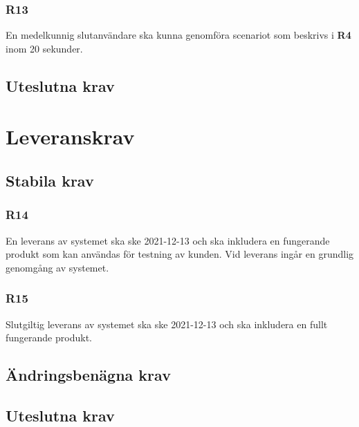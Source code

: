 \documentclass{article}
\begin{document}
    \subsubsection*{R13}
    En medelkunnig slutanvändare ska kunna genomföra scenariot som beskrivs i \textbf{R4} inom 20 sekunder.
    
    \subsection*{Uteslutna krav}
    
    \section{Leveranskrav}
    
    \subsection*{Stabila krav}
     \subsubsection*{R14}
     En leverans av systemet ska ske 2021-12-13 och ska inkludera en fungerande produkt som kan användas för testning av kunden. Vid leverans ingår en grundlig genomgång av systemet.
     
     \subsubsection*{R15}
     Slutgiltig leverans av systemet ska ske 2021-12-13 och ska inkludera en fullt fungerande produkt.
     
     
    \subsection*{Ändringsbenägna krav}
    
    \subsection*{Uteslutna krav}
    
    
   

\end{document}
